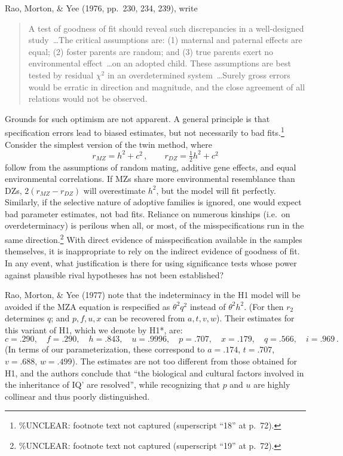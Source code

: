 ﻿\documentclass[12pt]{article}
\begin{document}
Rao, Morton, \& Yee (1976, pp.\ 230, 234, 239), write

\begin{quote}
A test of goodness of fit should reveal such discrepancies in a well-designed study~\ldots The critical assumptions are: (1) maternal and paternal effects are equal; (2) foster parents are random; and (3) true parents exert no environmental effect~\ldots on an adopted child. These assumptions are best tested by residual $\chi^2$ in an overdetermined system~\ldots Surely gross errors would be erratic in direction and magnitude, and the close agreement of all relations would not be observed.
\end{quote}

Grounds for such optimism are not apparent. A general principle is that specification errors lead to biased estimates, but not necessarily to bad fits.\footnote{\%UNCLEAR: footnote text not captured (superscript ``18'' at p.\ 72).} Consider the simplest version of the twin method, where
\begin{equation*}
r_{MZ} = h^2+c^2 \, , \qquad r_{DZ} = \tfrac12 h^2+c^2
\end{equation*}
follow from the assumptions of random mating, additive gene effects, and equal environmental correlations. If MZs share more environmental resemblance than DZs, $2(r_{MZ}-r_{DZ})$ will overestimate $h^2$, but the model will fit perfectly. Similarly, if the selective nature of adoptive families is ignored, one would expect bad parameter estimates, not bad fits. Reliance on numerous kinships (i.e.\ on overdeterminacy) is perilous when all, or most, of the misspecifications run in the same direction.\footnote{\%UNCLEAR: footnote text not captured (superscript ``19'' at p.\ 72).} With direct evidence of misspecification available in the samples themselves, it is inappropriate to rely on the indirect evidence of goodness of fit. In any event, what justification is there for using significance tests whose power against plausible rival hypotheses has not been established?

Rao, Morton, \& Yee (1977) note that the indeterminacy in the H1 model will be avoided if the MZA equation is respecified as $\theta^2q^2$ instead of $\theta^2h^2$. (For then $r_2$ determines $q$; and $p,f,u,x$ can be recovered from $a,t,v,w$). Their estimates for this variant of H1, which we denote by H1*, are:
\begin{equation*}
c=.290, \quad f=.290, \quad h=.843, \quad u=.9996, \quad p=.707, \quad x=.179, \quad q=.566, \quad i=.969 \, .
\end{equation*}
(In terms of our parameterization, these correspond to $a=.174$, $t=.707$, $v=.688$, $w=.499$). The estimates are not too different from those obtained for H1, and the authors conclude that ``the biological and cultural factors involved in the inheritance of IQ' are resolved'', while recognizing that $p$ and $u$ are highly collinear and thus poorly distinguished.
\end{document}
